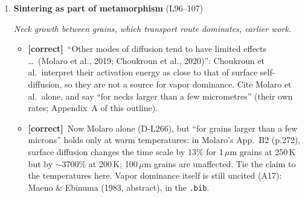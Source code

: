 \documentclass[11pt]{article}
\newcommand{\Pg}[3]{\item \textbf{#1} {\small(#2)}\par\textit{#3}}
\newcommand{\tC}{\textcolor{miss}{\textbf{[correct]}}\ }
\newcommand{\add}[1]{\textcolor{revA}{#1}}
\newcommand{\del}[1]{\textcolor{red}{[del: #1]}}
\begin{document}
\begin{enumerate}
\begin{itemize}
    it enough for shallow brines that radar could detect. They do not
    discuss sintering; that sintering raises the layer's conductivity is
    this paper's link, not theirs. Their values are for an airless surface;
    the conductivities here are with air at 1~atm and are not on their
    scale. \del{Not in the \texttt{.bib};}
    \add{In the \texttt{.bib} as the preprint (\texttt{10.22541/au.171386353.34274580/v2}); replace with the published article,} DOI \texttt{10.1029/2024JE008615}
    (Crossref: JGR Planets 129(12), e2024JE008615).
  \item Kempf et al.\ (2010) and Southworth et al.\ (2019) are cited as
    Choukroun et al.\ cite them; both are in the \texttt{.bib}
    (\texttt{kempfHowEnceladusDust2010},
    \texttt{southworthSurfaceDepositionEnceladus2019}).
  \end{itemize}
\Pg{Sintering as part of metamorphism}{L96--107}{Neck growth between grains, which transport route dominates, earlier work.}
  \begin{itemize}
  \item \tC ``Other modes of diffusion tend to have limited effects \ldots\
    (Molaro et al., 2019; Choukroun et al., 2020)'': Choukroun et al.\
    interpret their activation energy as close to that of surface
    self-diffusion, so they are not a source for vapor dominance. Cite
    Molaro et al.\ alone, and say ``for necks larger than a few
    micrometres'' (their own rates; Appendix~A of this outline).
  \item \add{\tC Now Molaro alone (D-L266), but ``for grains larger than a few microns'' holds only at warm temperatures: in Molaro's App.~B2 (p.272), surface diffusion changes the time scale by 13\% for 1\,$\mu$m grains at 250\,K but by $\sim$3700\% at 200\,K; 100\,$\mu$m grains are unaffected. Tie the claim to the temperatures here. Vapor dominance itself is still uncited (A17): Maeno \& Ebinuma (1983, abstract), in the \texttt{.bib}.}

\end{itemize}
\end{enumerate}
\end{document}
